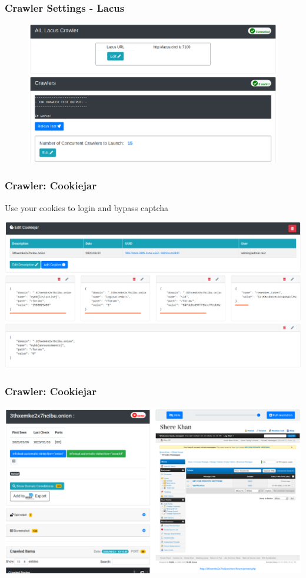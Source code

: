 \documentclass[10pt,aspectratio=169, colorlinks=true, linkcolor=circlBlue]{beamer}
\begin{document}
\begin{frame}
	\frametitle{Crawler Settings - Lacus}
		\begin{figure}
		    \includegraphics[scale=0.28]{screenshot/crawler_settings.png}
		\end{figure}
\end{frame}

\begin{frame}
    \frametitle{Crawler: Cookiejar}
    Use your cookies to login and bypass captcha
    \centerline{
        \includegraphics[scale=0.23]{screenshot/crawler-cookiejar-edit.png}
    }
\end{frame}

\begin{frame}
    \frametitle{Crawler: Cookiejar}
    \centerline{
        \includegraphics[scale=0.23]{screenshot/crawler-cookiejar-domain-crawled.png}
    }
\end{frame}
\end{document}

